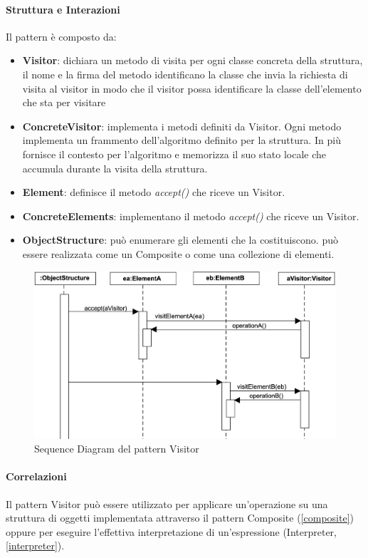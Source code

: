 \newpage

\paragraph{Struttura e Interazioni} Il pattern è composto da:
\begin{itemize}
    \item \textbf{Visitor}: dichiara un metodo di visita per ogni classe concreta della struttura, il nome e la firma del metodo identificano la classe che invia la richiesta di visita al visitor in modo che il visitor possa identificare la classe dell’elemento che sta per visitare 
    \item \textbf{ConcreteVisitor}: implementa i metodi definiti da Visitor. Ogni metodo implementa un frammento dell’algoritmo definito per la struttura. In più fornisce il contesto per l’algoritmo e memorizza il suo stato locale che accumula durante la visita della struttura. 
    \item \textbf{Element}: definisce il metodo \textit{accept()} che riceve un Visitor.
    \item \textbf{ConcreteElements}: implementano il metodo \textit{accept()} che riceve un Visitor.
    \item \textbf{ObjectStructure}: può enumerare gli elementi che la costituiscono. può essere realizzata come un Composite o come una collezione di elementi.
\end{itemize}

\begin{figure}[H]
    \centering
    \includegraphics[width=1\linewidth]{assets/pattern/visitor/visitor-sequence.png}
    \caption{Sequence Diagram del pattern Visitor}
\end{figure}

\paragraph{Correlazioni} Il pattern Visitor può essere utilizzato per applicare un'operazione su una struttura di oggetti implementata attraverso il pattern Composite (\ref{composite}) oppure per eseguire l'effettiva interpretazione di un'espressione (Interpreter, \ref{interpreter}).


\newpage